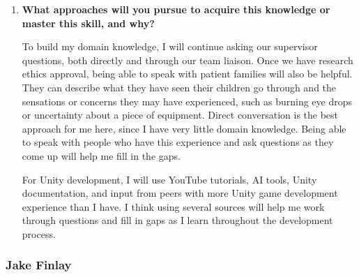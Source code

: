 \documentclass[10pt]{article}
\begin{document}
\begin{enumerate}
    \item \textbf{What approaches will you pursue to acquire this
    knowledge or master this skill, and why?}

    To build my domain knowledge, I will continue asking our supervisor
    questions, both directly and through our team liaison. Once we have
    research ethics approval, being able to speak with patient families
    will also be helpful. They can describe what they have seen their
    children go through and the sensations or concerns they may have
    experienced, such as burning eye drops or uncertainty about a piece
    of equipment. Direct conversation is the best approach for me here,
    since I have very little domain knowledge. Being able to speak with
    people who have this experience and ask questions as they come up
    will help me fill in the gaps.

    For Unity development, I will use YouTube tutorials, AI tools, Unity
    documentation, and input from peers with more Unity game development
    experience than I have. I think using several sources will help me
    work through questions and fill in gaps as I learn throughout the
    development process.

\end{enumerate}

\subsubsection*{Jake Finlay}
\end{document}
